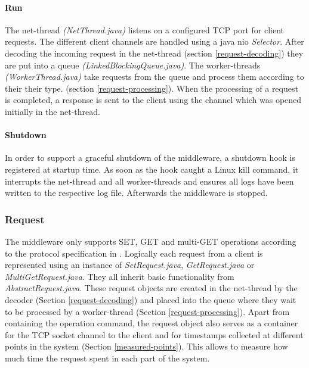 \documentclass[report.tex]{subfiles}
\begin{document}
\paragraph{Run}
The net-thread \emph{(NetThread.java)} listens on a configured TCP port for client requests. The different client channels are handled using a java nio \emph{Selector}.
After decoding the incoming request in the net-thread (section \ref{request-decoding}) they are put into a queue \emph{(LinkedBlockingQueue.java)}.
The worker-threads \emph{(WorkerThread.java)} take requests from the queue and process them according to their their type. (section  \ref{request-processing}). When the processing of a request is completed, a response is sent to the client using the channel which was opened initially in the net-thread.


\paragraph{Shutdown}
In order to support a graceful shutdown of the middleware, a shutdown hook is registered at startup time. As soon as the hook caught a Linux kill command, it interrupts the net-thread and all worker-threads and ensures all logs have been written to the respective log file. Afterwards the middleware is stopped.

\subsubsection{Request}
The middleware only supports SET, GET and multi-GET operations according to the protocol specification in \cite{memcached:protocol}.
Logically each request from a client is represented using an instance of \emph{SetRequest.java}, \emph{GetRequest.java} or \emph{MultiGetRequest.java}. They all inherit basic functionality from \emph{AbstractRequest.java}.
These request objects are created in the net-thread by the decoder (Section \ref{request-decoding}) and placed into the queue where they wait to be processed by a worker-thread (Section \ref{request-processing}).
Apart from containing the operation command, the request object also serves as a container for the TCP socket channel to the client and for timestamps collected at different points in the system (Section \ref{measured-points}). This allows to measure how much time the request spent in each part of the system.
\end{document}
